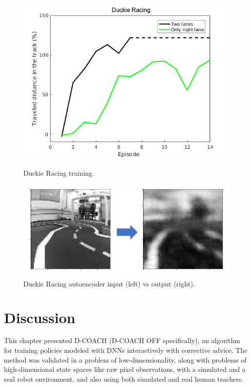 \begin{figure}[H]
    \centering
    \begin{minipage}{.5\textwidth}
    \vspace{-0.2cm}
    \includegraphics[width=1.0\linewidth]{imagenes/cap3/racing_duckie_results.png}
    \vspace{-0.2cm}
    \caption{Duckie Racing training.}
    \label{fig:racing_duckie_results}
    \end{minipage}%
    \begin{minipage}{.5\textwidth}
    \centering
    \includegraphics[width=1.0\linewidth]{imagenes/cap3/AE_duckie2.png}
    \vspace{-0.2cm}
    \caption{Duckie Racing autoencoder input (left) vs output (right).}
    \label{fig:AE_duckie}
    \end{minipage}
\end{figure}

\section{Discussion}
This chapter presented D-COACH (D-COACH OFF specifically), an algorithm for training policies modeled with DNNs interactively with corrective advice. The method was validated in a problem of low-dimensionality, along with problems of high-dimensional state spaces like raw pixel observations, with a simulated and a real robot environment, and also using both simulated and real human teachers. 

